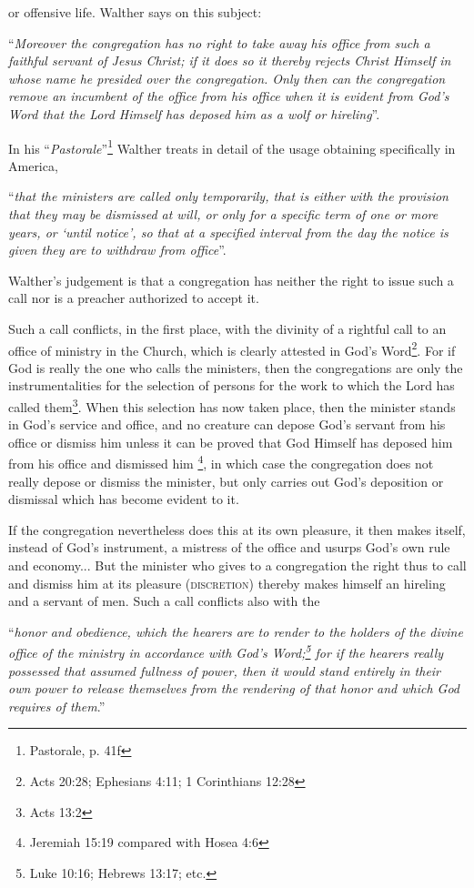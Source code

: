 or offensive life.  Walther says on this subject: \begin{displayquote}“\textit{Moreover the congregation has no right to take away his office from such a faithful servant of Jesus Christ; if it does so it thereby rejects Christ Himself in whose name he presided over the congregation.  Only then can the congregation remove an incumbent of the office from his office when it is evident from God’s Word that the Lord Himself has deposed him as a wolf or hireling}”.\end{displayquote}  In his “\textit{Pastorale}”\footnote{Pastorale, p. 41f} Walther treats in detail of the usage obtaining specifically in America, \begin{displayquote}“\textit{that the ministers are called only temporarily, that is either with the provision that they may be dismissed at will, or only for a specific term of one or more years, or ‘until notice’, so that at a specified interval from the day the notice is given they are to withdraw from office}”.\end{displayquote}  Walther’s judgement is that a congregation has neither the right to issue such a call nor is a preacher authorized to accept it. \begin{fancyquotes}Such a call conflicts, in the first place, with the divinity of a rightful call to an office of ministry in the Church, which is clearly attested in God’s Word\footnote{Acts 20:28; Ephesians 4:11; 1 Corinthians 12:28}.  For if God is really the one who calls the ministers, then the congregations are only the instrumentalities for the selection of persons for the work to which the Lord has called them\footnote{Acts 13:2}.  When this selection has now taken place, then the minister stands in God’s service and office, and no creature can depose God’s servant from his office or dismiss him unless it can be proved that God Himself has deposed him from his office and dismissed him \footnote{Jeremiah 15:19 compared with Hosea 4:6}, in which case the congregation does not really depose or dismiss the minister, but only carries out God’s deposition or dismissal which has become evident to it.
\par
        If the congregation nevertheless does this at its own pleasure, it then makes itself, instead of God’s instrument, a mistress of the office and usurps God’s own rule and economy...  But the minister who gives to a congregation the right thus to call and dismiss him at its pleasure {\scriptsize\textsc{(discretion)}} thereby makes himself an hireling and a servant of men.  Such a call conflicts also with the \begin{displayquote}“\textit{honor and obedience, which the hearers are to render to the holders of the divine office of the ministry in accordance with God’s Word;\footnote{Luke 10:16; Hebrews 13:17; etc.} for if the hearers really possessed that assumed fullness of power, then it would stand entirely in their own power to release themselves from the rendering of that honor and which God requires of them}.''\end{displayquote}


\end{fancyquotes}

